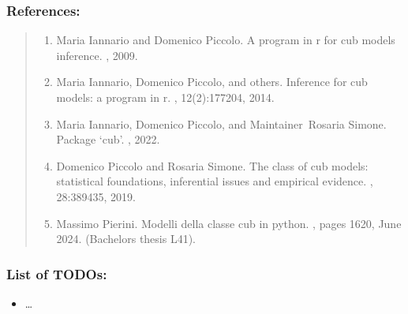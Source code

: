 \documentclass[letterpaper,10pt,english]{sphinxmanual}
\begin{document}
\subsubsection{References:}
\label{\detokenize{cubmods:id507}}\begin{quote}
\begin{enumerate}
%
\setcounter{enumi}{0}
\item {} 
\sphinxAtStartPar
Maria Iannario and Domenico Piccolo. A program in r for cub models inference. , 2009.

\item {} 
\sphinxAtStartPar
Maria Iannario, Domenico Piccolo, and others. Inference for cub models: a program in r. , 12(2):177\textendash{}204, 2014.

\item {} 
\sphinxAtStartPar
Maria Iannario, Domenico Piccolo, and Maintainer Rosaria Simone. Package ‘cub’. , 2022.

\item {} 
\sphinxAtStartPar
Domenico Piccolo and Rosaria Simone. The class of cub models: statistical foundations, inferential issues and empirical evidence. , 28:389\textendash{}435, 2019.

\item {} 
\sphinxAtStartPar
Massimo Pierini. Modelli della classe cub in python. , pages 16\textendash{}20, June 2024. (Bachelor\textquotesingle{}s thesis L\sphinxhyphen{}41).

\end{enumerate}
\end{quote}


\subsubsection{List of TODOs:}
\label{\detokenize{cubmods:id545}}\begin{itemize}
\item {} 
\sphinxAtStartPar
…

\end{itemize}
\end{document}
